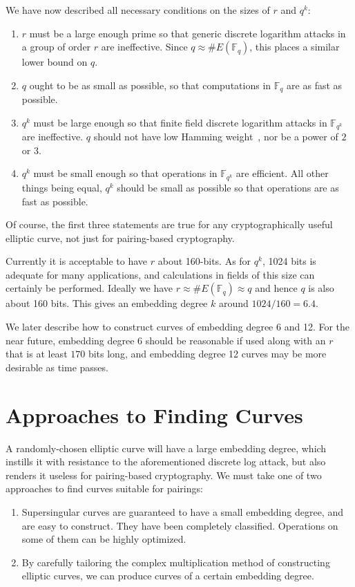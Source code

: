 We have now described all necessary conditions on the sizes of
$r$ and $q^k$:

\begin{enumerate}
\item
$r$ must be a large enough prime so that generic discrete logarithm attacks
in a group of order $r$ are ineffective. Since $q \approx \#E(\mathbb{F}_q)$,
this places a similar lower bound on $q$.
\item
$q$ ought to be as small as possible, so that computations in $\mathbb{F}_q$
are as fast as possible.
\item
$q^k$ must be large enough so that finite field discrete logarithm attacks
in $\mathbb{F}_{q^k}$ are ineffective.
$q$ should not have low Hamming weight~\cite{stinson}, nor be a power of
$2$ or $3$.
\item
$q^k$ must be small enough so that operations in $\mathbb{F}_{q^k}$
are efficient. All other things being equal,
$q^k$ should be small as possible so that operations
are as fast as possible.
\end{enumerate}

Of course, the first three statements are true for any cryptographically
useful elliptic curve, not just for pairing-based cryptography.

Currently it is acceptable to have $r$ about 160-bits.
As for $q^k$, 1024 bits is adequate for many applications, and calculations
in fields of this size can certainly be performed.
Ideally we have $r \approx \#E(\mathbb{F}_q) \approx q$
and hence $q$ is also about 160 bits. This gives an
embedding degree $k$ around $1024 / 160 = 6.4$.

We later describe how to construct curves of embedding degree 6 and 12.
For the near future, embedding degree 6 should be reasonable if used along
with an $r$ that is at least $170$ bits long,
and embedding degree 12 curves may be more desirable as time passes.

\section {Approaches to Finding Curves}

A randomly-chosen elliptic curve will have a large embedding
degree, which instills it with resistance to the aforementioned discrete log
attack, but also renders it useless for pairing-based cryptography.
We must take one of two approaches to find curves suitable for pairings:

\begin{enumerate}
\item
Supersingular curves are guaranteed to have a small embedding degree,
and are easy to construct. They have been completely classified. Operations
on some of them can be highly optimized.
\item
By carefully tailoring the complex multiplication method of constructing
elliptic curves, we can produce curves of a certain embedding degree. 
\end{enumerate}

